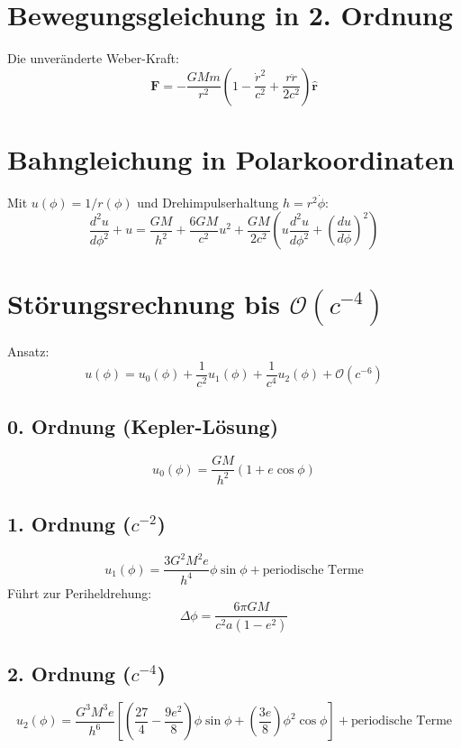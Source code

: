 \section{Bewegungsgleichung in 2. Ordnung}
Die unveränderte Weber-Kraft:
\begin{equation}
\mathbf{F} = -\frac{GMm}{r^2} \left( 1 - \frac{\dot{r}^2}{c^2} + \frac{r \ddot{r}}{2c^2} \right) \mathbf{\hat{r}}
\end{equation}

\section{Bahngleichung in Polarkoordinaten}
Mit $u(\phi) = 1/r(\phi)$ und Drehimpulserhaltung $h = r^2 \dot{\phi}$:
\begin{equation}
\frac{d^2u}{d\phi^2} + u = \frac{GM}{h^2} + \frac{6GM}{c^2} u^2 + \frac{GM}{2c^2} \left( u \frac{d^2u}{d\phi^2} + \left( \frac{du}{d\phi} \right)^2 \right)
\end{equation}

\section{Störungsrechnung bis $\mathcal{O}(c^{-4})$}
Ansatz:
\begin{equation}
u(\phi) = u_0(\phi) + \frac{1}{c^2} u_1(\phi) + \frac{1}{c^4} u_2(\phi) + \mathcal{O}(c^{-6})
\end{equation}

\subsection{0. Ordnung (Kepler-Lösung)}
\begin{equation}
u_0(\phi) = \frac{GM}{h^2} \left( 1 + e \cos \phi \right)
\end{equation}

\subsection{1. Ordnung ($c^{-2}$)}
\begin{equation}
u_1(\phi) = \frac{3G^2M^2 e}{h^4} \phi \sin \phi + \text{periodische Terme}
\end{equation}
Führt zur Periheldrehung:
\begin{equation}
\Delta \phi = \frac{6\pi GM}{c^2 a(1-e^2)}
\end{equation}

\subsection{2. Ordnung ($c^{-4}$)}
\begin{equation}
u_2(\phi) = \frac{G^3M^3 e}{h^6} \left[ \left( \frac{27}{4} - \frac{9e^2}{8} \right) \phi \sin \phi + \left( \frac{3e}{8} \right) \phi^2 \cos \phi \right] + \text{periodische Terme}
\end{equation}

